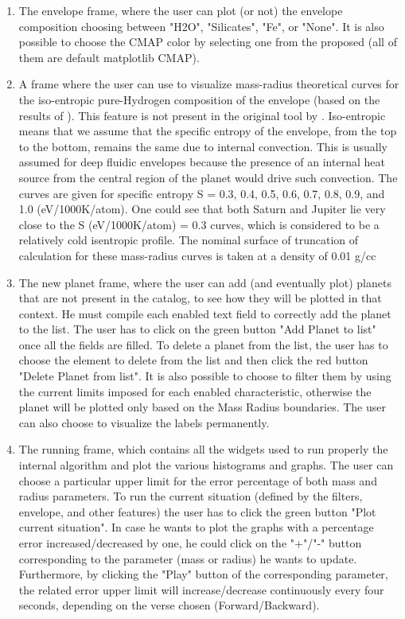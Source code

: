 \documentclass[fleqn,10pt]{SelfArx} %
\begin{document}
\begin{enumerate}
                \item The envelope frame, where the user can plot (or not) the envelope composition choosing between "H2O", "Silicates", "Fe", or "None". It is also possible to choose the CMAP color by selecting one from the proposed (all of them are default matplotlib CMAP).
                \item A frame where the user can use to visualize mass-radius theoretical curves for the iso-entropic pure-Hydrogen composition of the envelope (based on the results of \textit{\cite{Becker2014}}). This feature is not present in the original tool by \textit{\cite{Zeng2021}}. Iso-entropic means that we assume that the specific entropy of the envelope, from the top to the bottom, remains the same due to internal convection. This is usually assumed for deep fluidic envelopes because the presence of an internal heat source from the central region of the planet would drive such convection. The curves are given for speciﬁc entropy S = 0.3, 0.4, 0.5, 0.6, 0.7, 0.8, 0.9, and 1.0 (eV/1000K/atom). One could see that both Saturn and Jupiter lie very close to the S (eV/1000K/atom) = 0.3 curves, which is considered to be a relatively cold isentropic profile. The nominal surface of truncation of calculation for these mass-radius curves is taken at a density of 0.01 g/cc
                \item The new planet frame, where the user can add (and eventually plot) planets that are not present in the catalog, to see how they will be plotted in that context. He must compile each enabled text field to correctly add the planet to the list. The user has to click on the green button "Add Planet to list" once all the fields are filled. To delete a planet from the list, the user has to choose the element to delete from the list and then click the red button "Delete Planet from list". It is also possible to choose to filter them by using the current limits imposed for each enabled characteristic, otherwise the planet will be plotted only based on the Mass Radius boundaries. The user can also choose to visualize the labels permanently.
                \item The running frame, which contains all the widgets used to run properly the internal algorithm and plot the various histograms and graphs. The user can choose a particular upper limit for the error percentage of both mass and radius parameters. To run the current situation (defined by the filters, envelope, and other features) the user has to click the green button "Plot current situation". In case he wants to plot the graphs with a percentage error increased/decreased by one, he could click on the "+"/"-" button corresponding to the parameter (mass or radius) he wants to update. Furthermore, by clicking the "Play" button of the corresponding parameter, the related error upper limit will increase/decrease continuously every four seconds, depending on the verse chosen (Forward/Backward).

\end{enumerate}
\end{document}
